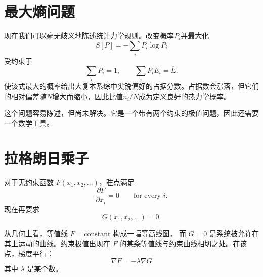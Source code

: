 \section{最大熵问题}

现在我们可以毫无歧义地陈述统计力学规则。改变概率\(P_i\)并最大化
\begin{equation}
 S[P]=-\sum_iP_i\log P_i
 \label{eq:sm3-maximize-entropy}
\end{equation}
受约束于
\begin{equation}
 \sum_iP_i=1,
 \qquad
 \sum_iP_iE_i=\overline E.
 \label{eq:sm3-maxent-constraints}
\end{equation}
使该式最大的概率给出大复本系综中尖锐偏好的占据分数。占据数会涨落，但它们的相对偏差随\(N\)增大而缩小，因此比值\(n_i/N\)成为定义良好的热力学概率。

\begin{classroomqa}
\end{classroomqa}

这个问题容易陈述，但尚未解决。它是一个带有两个约束的极值问题，因此还需要一个数学工具。

\section{拉格朗日乘子}

对于无约束函数 \(F(x_1,x_2,\ldots)\)，驻点满足
\begin{equation}
 \frac{\partial F}{\partial x_i}=0
 \qquad\text{for every }i.
 \label{eq:sm3-unconstrained-stationary}
\end{equation}
现在再要求
\begin{equation}
 G(x_1,x_2,\ldots)=0.
 \label{eq:sm3-one-constraint}
\end{equation}

\begin{classroomqa}
\end{classroomqa}

从几何上看，等值线 \(F=\text{constant}\) 构成一幅等高线图，
而 \(G=0\) 是系统被允许在其上运动的曲线。约束极值出现在
\(F\) 的某条等值线与约束曲线相切之处。在该点，梯度平行：
\begin{equation}
 \nabla F=-\lambda\nabla G
 \label{eq:sm3-parallel-gradients}
\end{equation}
其中 \(\lambda\) 是某个数。

